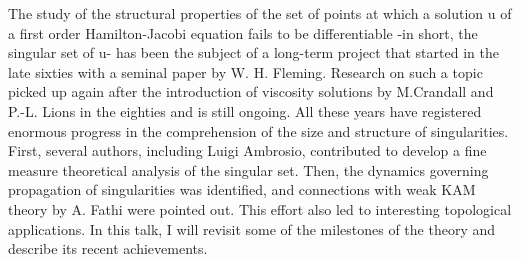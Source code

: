 \mypage
{}
\begin{myabstract}
The study of the structural properties of the set of points at which a solution u of a first order Hamilton-Jacobi equation fails to be differentiable -in short, the singular set of u- has been the subject of a long-term project that started in the late sixties with a seminal paper by W. H. Fleming. Research on such a topic picked up again after the introduction of viscosity solutions by M.Crandall and P.-L. Lions in the eighties and is still ongoing. All these years have registered enormous progress in the comprehension of the size and structure of singularities. First, several authors, including Luigi Ambrosio, contributed to develop a fine measure theoretical analysis of the singular set. Then, the dynamics governing propagation of singularities was identified, and connections with weak KAM theory by A. Fathi were pointed out. This effort also led to interesting topological applications. In this talk, I will revisit some of the milestones of the theory and describe its recent achievements.
\end{myabstract}
